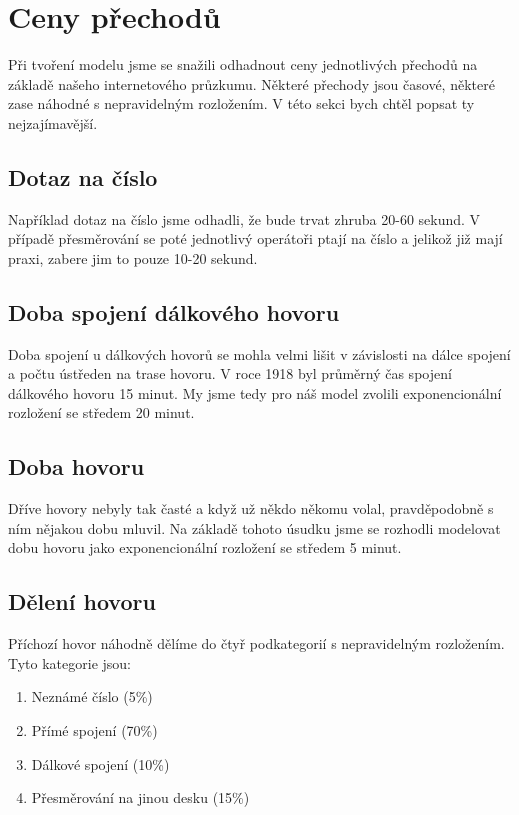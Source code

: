 \documentclass{article}
\begin{document}
\section{Ceny přechodů}

Při tvoření modelu jsme se snažili odhadnout ceny jednotlivých přechodů na
základě našeho internetového průzkumu. Některé přechody jsou časové, některé
zase náhodné s nepravidelným rozložením. V této sekci bych chtěl popsat ty
nejzajímavější.

\subsection*{Dotaz na číslo}

Například dotaz na číslo jsme odhadli, že bude trvat zhruba 20-60 sekund.
V případě přesměrování se poté jednotlivý operátoři ptají na číslo a jelikož
již mají praxi, zabere jim to pouze 10-20 sekund.

\subsection*{Doba spojení dálkového hovoru}

Doba spojení u dálkových hovorů se mohla velmi lišit v závislosti na dálce
spojení a počtu ústředen na trase hovoru. V roce 1918 byl průměrný čas spojení
dálkového hovoru 15 minut. My jsme tedy pro náš model zvolili exponencionální
rozložení se středem 20 minut.

\subsection*{Doba hovoru}

Dříve hovory nebyly tak časté a když už někdo někomu volal, pravděpodobně s ním
nějakou dobu mluvil. Na základě tohoto úsudku jsme se rozhodli modelovat dobu
hovoru jako exponencionální rozložení se středem 5 minut.

\subsection*{Dělení hovoru}

Příchozí hovor náhodně dělíme do čtyř podkategorií s nepravidelným rozložením.
Tyto kategorie jsou:
\begin{enumerate}
    \item Neznámé číslo (5\%)
    \item Přímé spojení (70\%)
    \item Dálkové spojení (10\%)
    \item Přesměrování na jinou desku (15\%)
\end{enumerate}
\end{document}
